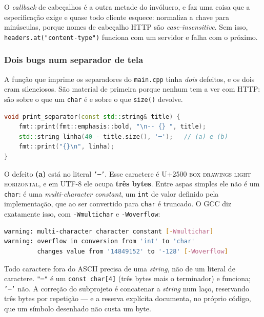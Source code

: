 O \emph{callback} de cabeçalhos é a outra metade do invólucro, e faz uma coisa
que a especificação exige e quase todo cliente esquece: normaliza a chave para
minúsculas, porque nomes de cabeçalho HTTP são \emph{case-insensitive}. Sem
isso, \texttt{headers.at("content-type")} funciona com um servidor e falha com
o próximo.

\subsubsection{Dois bugs num separador de tela}

A função que imprime os separadores do \texttt{main.cpp} tinha \emph{dois}
defeitos, e os dois eram silenciosos. São material de primeira porque nenhum
tem a ver com HTTP: são sobre o que um \texttt{char} é e sobre o que
\texttt{size()} devolve.

\begin{lstlisting}[style=bt, language=C++,
    caption={A versão com os dois bugs. Uma linha, dois defeitos de categorias
             diferentes.}]
void print_separator(const std::string& title) {
    fmt::print(fmt::emphasis::bold, "\n-- {} ", title);
    std::string linha(40 - title.size(), '─');   // (a) e (b)
    fmt::print("{}\n", linha);
}
\end{lstlisting}

O defeito \textbf{(a)} está no literal \texttt{'─'}. Esse caractere é
U+2500 \textsc{box drawings light horizontal}, e em UTF-8 ele ocupa
\textbf{três bytes}. Entre aspas simples ele não é um \texttt{char}: é uma
\emph{multi-character constant}, um \texttt{int} de valor definido pela
implementação, que ao ser convertido para \texttt{char} é truncado. O GCC diz
exatamente isso, com \texttt{-Wmultichar} e \texttt{-Woverflow}:

\begin{lstlisting}[style=bt, language=bash,
    caption={O aviso do GCC. Note o valor: 14849152 é o inteiro de três bytes
             que o literal produziu.}]
warning: multi-character character constant [-Wmultichar]
warning: overflow in conversion from 'int' to 'char'
         changes value from '14849152' to '-128' [-Woverflow]
\end{lstlisting}

\begin{regra}
Todo caractere fora do ASCII precisa de uma \emph{string}, não de um literal de
caractere. \texttt{"─"} é um \texttt{const char[4]} (três bytes mais o
terminador) e funciona; \texttt{'─'} não. A correção do subprojeto é
concatenar a \emph{string} num laço, reservando três bytes por repetição ---
e a reserva explícita documenta, no próprio código, que um símbolo desenhado
não custa um byte.
\end{regra}

